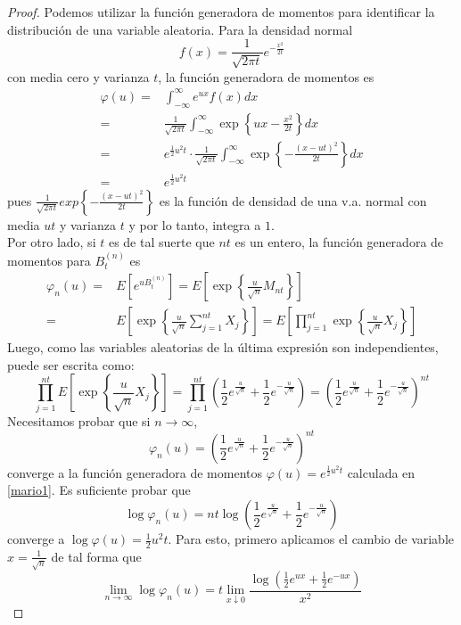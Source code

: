 \documentclass[11pt,notitlepage]{article}
\begin{document}
\begin{proof}
Podemos utilizar la función generadora de momentos para identificar la distribución de una variable aleatoria. Para la densidad normal
 \[f(x)= \frac{1}{\sqrt{2\pi t}}e^{-\frac{x^2}{2t}}\]
 con media cero y varianza $t$, la función generadora de momentos es
 \begin{align}
 \nonumber
     \varphi(u) = & \int_{-\infty}^{\infty}e^{ux}f(x)dx  \\ \nonumber
     = & \frac{1}{\sqrt{2\pi t}}\int_{-\infty}^{\infty} \exp\left\{ ux -\frac{x^2}{2t} \right\} dx\\ \nonumber
     = & e^{\frac{1}{2}u^2t}\cdot  \frac{1}{\sqrt{2\pi t}}\int_{-\infty}^{\infty} \exp\left\{ -\frac{(x - ut)^2}{2t} \right\} dx\\
     \label{mario1}
     = & e^{\frac{1}{2}u^2t}
 \end{align}
 pues $\frac{1}{\sqrt{2\pi t}}exp\left\{ -\frac{(x - ut)^2}{2t} \right\}$ es la función de densidad de una v.a. normal con media $ut$ y varianza $t$ y por lo tanto, integra a $1$.\\
 Por otro lado, si $t$ es de tal suerte que $nt$ es un entero, la función generadora de momentos para $B^{(n)}_{t}$ es
 \begin{align*}
     \varphi_n(u) = & E[e^{uB^{(n)}_{t}}] = E\left[\exp\left\{ \frac{u}{\sqrt{n}}M_{nt}\right\}\right]\\
     = & E\left[\exp\left\{ \frac{u}{\sqrt{n}}\sum_{j=1}^{nt}X_j\right\}\right] = E\left[\prod_{j=1}^{nt}\exp\left\{ \frac{u}{\sqrt{n}}X_j\right\}\right]
 \end{align*}
 Luego, como las variables aleatorias de la última expresión son independientes, puede ser escrita como:
 \[\prod_{j=1}^{nt}E\left[\exp\left\{ \frac{u}{\sqrt{n}}X_j\right\}\right] = \prod_{j=1}^{nt} \left(\frac{1}{2}e^{\frac{u}{\sqrt{n}}} + \frac{1}{2}e^{-\frac{u}{\sqrt{n}}}\right) = \left(\frac{1}{2}e^{\frac{u}{\sqrt{n}}} + \frac{1}{2}e^{-\frac{u}{\sqrt{n}}}\right)^{nt} \]
 Necesitamos probar que si $n \rightarrow \infty$,
 \[\varphi_n(u) = \left(\frac{1}{2}e^{\frac{u}{\sqrt{n}}} + \frac{1}{2}e^{-\frac{u}{\sqrt{n}}}\right)^{nt} \]
 converge a la función generadora de momentos $ \varphi(u) = e^{\frac{1}{2}u^2t}$ calculada en  \eqref{mario1}. Es suficiente probar que
 \[\log \varphi_n(u) = nt\log \left(\frac{1}{2}e^{\frac{u}{\sqrt{n}}} + \frac{1}{2}e^{-\frac{u}{\sqrt{n}}}\right) \]
 converge a $\log \varphi(u) = \frac{1}{2}u^2t$.
 Para esto, primero aplicamos el cambio de variable $ x = \frac{1}{\sqrt{n}}$ de tal forma que
 \[\lim_{n \rightarrow\infty} \log \varphi_n(u) = t\lim_{x\downarrow0}\dfrac{\log(\frac{1}{2}e^{ux} + \frac{1}{2}e^{-ux} )}{x^2}\]

\end{proof}
\end{document}
